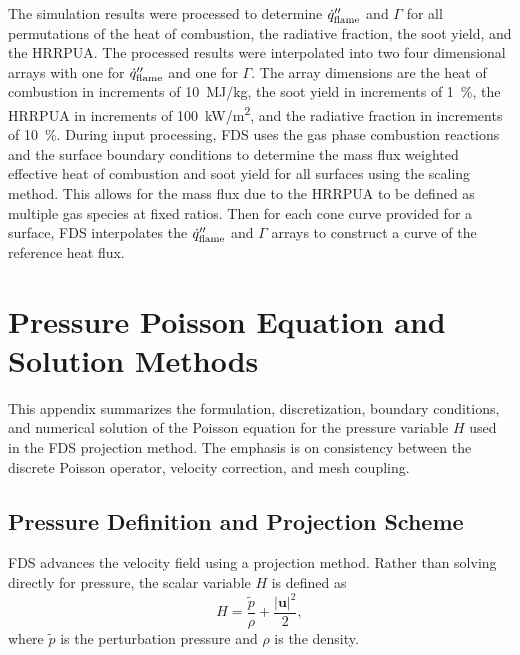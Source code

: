 The simulation results were processed to determine $\dot{q}_{\rm flame}''$ and $\Gamma$ for all permutations of the heat of combustion, the radiative fraction, the soot yield, and the HRRPUA. The processed results were interpolated into two four dimensional arrays with one for $\dot{q}_{\rm flame}''$ and one for $\Gamma$. The array dimensions are the heat of combustion in increments of 10~MJ/kg, the soot yield in increments of 1~\%, the HRRPUA in increments of 100~\unit{kW/m^2}, and the radiative fraction in increments of 10~\%. During input processing, FDS uses the gas phase combustion reactions and the surface boundary conditions to determine the mass flux weighted effective heat of combustion and soot yield for all surfaces using the scaling method. This allows for the mass flux due to the HRRPUA to be defined as multiple gas species at fixed ratios. Then for each cone curve provided for a surface, FDS interpolates the $\dot{q}_{\rm flame}''$ and $\Gamma$ arrays to construct a curve of the reference heat flux.


\chapter{Pressure Poisson Equation and Solution Methods}
\label{ch:pressure_poisson}

This appendix summarizes the formulation, discretization, boundary conditions, and numerical solution of the Poisson equation for the pressure variable $H$ used in the FDS projection method. The emphasis is on consistency between the discrete Poisson operator, velocity correction, and mesh coupling.

\section{Pressure Definition and Projection Scheme}

FDS advances the velocity field using a projection method. Rather than solving directly for pressure, the scalar variable $H$ is defined as
\begin{equation}
H = \frac{\tilde{p}}{\rho} + \frac{|\mathbf{u}|^2}{2},
\label{eq:H_definition}
\end{equation}
where $\tilde{p}$ is the perturbation pressure and $\rho$ is the density.

